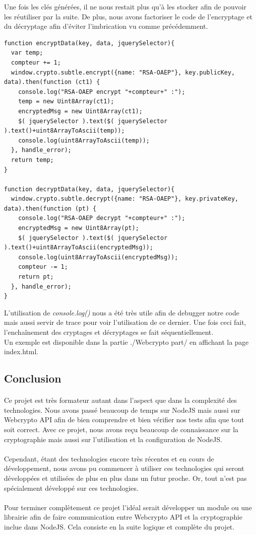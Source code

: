 \documentclass[a4paper,12pt]{report}
\begin{document}
	Une fois les clés générées, il ne nous restait plus qu'à les stocker afin de pouvoir les réutiliser par la suite. De plus, nous avons factoriser le code de l'encryptage et du décryptage afin d'éviter l'imbrication vu comme précédemment. 
		\begin{lstlisting}
function encryptData(key, data, jquerySelector){
  var temp;
  compteur += 1;
  window.crypto.subtle.encrypt({name: "RSA-OAEP"}, key.publicKey, data).then(function (ct1) {
    console.log("RSA-OAEP encrypt "+compteur+" :");
    temp = new Uint8Array(ct1);
    encryptedMsg = new Uint8Array(ct1);
    $( jquerySelector ).text($( jquerySelector ).text()+uint8ArrayToAscii(temp));
    console.log(uint8ArrayToAscii(temp));
  }, handle_error);
  return temp;
}

function decryptData(key, data, jquerySelector){
  window.crypto.subtle.decrypt({name: "RSA-OAEP"}, key.privateKey, data).then(function (pt) {
    console.log("RSA-OAEP decrypt "+compteur+" :");
    encryptedMsg = new Uint8Array(pt);
    $( jquerySelector ).text($( jquerySelector ).text()+uint8ArrayToAscii(encryptedMsg));
    console.log(uint8ArrayToAscii(encryptedMsg));
    compteur -= 1;
    return pt;
  }, handle_error);
}	
	\end{lstlisting}
	L'utilisation de \textit{console.log()} nous a été très utile afin de debugger notre code mais aussi servir de trace pour voir l'utilisation de ce dernier. Une fois ceci fait, l'enchaînement des cryptages et décryptages se fait séquentiellement.\\
	Un exemple est disponible dans la partie ./Webcrypto part/ en affichant la page index.html.

\newpage	
\begin{center}
\section*{Conclusion}
\end{center}
\paragraph*{}
Ce projet est très formateur autant dans l'aspect que dans la complexité des technologies. Nous avons passé beaucoup de temps sur NodeJS mais aussi sur Webcrypto API afin de bien comprendre et bien vérifier nos tests afin que tout soit correct. Avec ce projet, nous avons reçu beaucoup de connaissance sur la cryptographie mais aussi sur l'utilisation et la configuration de NodeJS.
\paragraph*{}
Cependant, étant des technologies encore très récentes et en cours de développement, nous avons pu commencer à utiliser ces technologies qui seront développées et utilisées de plus en plus  dans un futur proche. Or, tout n'est pas spécialement développé sur ces technologies.
\paragraph*{}
Pour terminer complètement ce projet l'idéal serait développer un module ou une librairie afin de faire communication entre Webcrypto API et la cryptographie inclue dans NodeJS. Cela consiste en la suite logique et complète du projet. 
\end{document}
